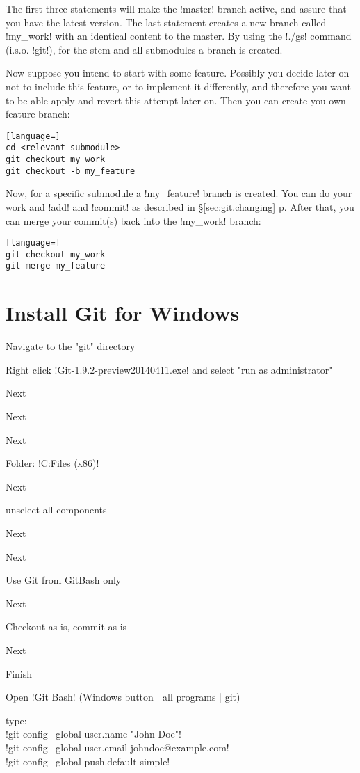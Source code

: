 \noindent
The first three statements will make the !master! branch active, and assure
that you have the latest version. The last statement creates a new branch
called !my_work! with an identical content to the master. By using the !./gs!
command (i.s.o. !git!), for the stem and all submodules a branch is created.

Now suppose you intend to start with some feature. Possibly you decide later on
not to include this feature, or to implement it differently, and therefore you
want to be able apply and revert this attempt later on. Then you can create
you own feature branch:

\begin{lstlisting}[language=]
cd <relevant submodule>
git checkout my_work
git checkout -b my_feature
\end{lstlisting}

\noindent
Now, for a specific submodule a !my_feature! branch is created. You can do your
work and !add! and !commit! as described in \S\ref{sec:git.changing}
p\pageref{sec:git.changing}. After that, you can merge your commit(s) back into
the !my_work! branch:

\begin{lstlisting}[language=]
git checkout my_work
git merge my_feature
\end{lstlisting}

\section{Install Git for Windows\label{sec:git.install.win}}

\begin{enumerate*}
\item Navigate to the "git" directory
\item Right click !Git-1.9.2-preview20140411.exe! and select "run as
      administrator"
\item Next
\item Next
\item Next
\item Folder: !C:\Program Files (x86)\Git!
\item Next
\item unselect all components
\item Next
\item Next
\item Use Git from GitBash only
\item Next
\item Checkout as-is, commit as-is
\item Next
\item Finish
\item Open !Git Bash! (Windows button | all programs | git)
\item type:\\ 
      !git config --global user.name "John Doe"! \\
      !git config --global user.email johndoe@example.com! \\
      !git config --global push.default simple!
\end{enumerate*}

